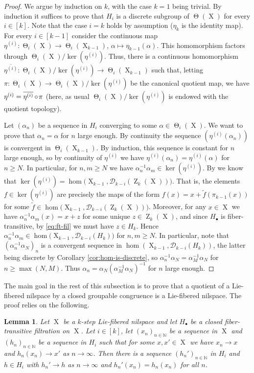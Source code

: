 \documentclass[a4paper,12pt,reqno]{amsart}
\newtheorem{lemma}[theorem]{Lemma}
\theoremstyle{definition}
\def\to{\rightarrow}
\newcommand{\mc}{\mathcal}
\newcommand{\mb}{\mathbb}
\DeclareMathOperator{\ab}{Z}
\DeclareMathOperator{\tran}{\Theta}
\DeclareMathOperator{\ns}{X}
\DeclareMathOperator{\co}{\circ\hspace{-0.02 cm}}
\begin{document}
\begin{proof}
We argue by induction on $k$, with the case $k=1$ being trivial. By induction it suffices to prove that $H_i$ is a discrete subgroup of $\tran(\ns)$ for every $i\in[k]$. Note that the case $i=k$ holds by assumption ($\eta_k$ is the identity map). For every $i\in [k-1]$ consider the continuous map $\eta^{(i)}:\tran_i(\ns)\to \tran_i(\ns_{k-1})$, $\alpha\mapsto \eta_{k-1}(\alpha)$. This homomorphism factors through $\tran_i(\ns)/\ker(\eta^{(i)})$. Thus, there is a continuous homomorphism $\overline{\eta^{(i)}}:\tran_i(\ns)/\ker(\eta^{(i)})\to \tran_i(\ns_{k-1})$ such that, letting $\pi:\tran_i(\ns)\to\tran_i(\ns)/\ker(\eta^{(i)})$ be the canonical quotient map, we have $\eta^{(i)} = \overline{\eta^{(i)}}\co \pi$ (here, as usual $\tran_i(\ns)/\ker(\eta^{(i)})$ is endowed with the quotient topology).

Let $(\alpha_n)$ be a sequence in $H_i$ converging to some $\alpha\in \tran_i(\ns)$. We want to prove that $\alpha_n=\alpha$ for $n$ large enough. By continuity the sequence $(\eta^{(i)}(\alpha_n))$ is convergent in $\tran_i(\ns_{k-1})$. By induction, this sequence is constant for $n$ large enough,  so by continuity of $\eta^{(i)}$ we have  $\eta^{(i)}(\alpha_n) = \eta^{(i)}(\alpha)$ for $n\ge N$. In particular, for $n,m\ge N$ we have  $\alpha_n^{-1}\alpha_m\in \ker(\eta^{(i)})$. By \cite[Lemma 2.9.5]{Cand:Notes2} we know that $\ker(\eta^{(i)})=\hom\big(\ns_{k-1},\mc{D}_{k-i}(\ab_k(\ns))\big)$. That is, the elements $f\in \ker(\eta^{(i)})$ are precisely the maps of the form $f(x)=x+\tilde{f}(\pi_{k-1}(x))$ for some $\tilde{f}\in \hom\big(\ns_{k-1},\mc{D}_{k-i}(\ab_k(\ns))\big)$. Moreover, for any $x\in \ns$ we have  $\alpha_n^{-1}\alpha_m(x)=x+z$ for some unique $z\in \ab_k(\ns)$, and since $H_\bullet$ is fiber-transitive, by \eqref{eq:ft-fil} we must have $z\in H_k$. Hence $\alpha_n^{-1}\alpha_m \in \hom\big(\ns_{k-1},\mc{D}_{k-i}(H_k)\big) $ for $n,m\ge N$. In particular, note that $(\alpha_n^{-1}\alpha_N)_n$ is a convergent sequence in $\hom(\ns_{k-1},\mc{D}_{k-i}(H_k))$, the latter being discrete by Corollary \ref{cor:hom-is-discrete}, so $\alpha_n^{-1}\alpha_N = \alpha_M^{-1}\alpha_N$ for $n\ge \max(N,M)$. Thus $\alpha_n=\alpha_N (\alpha_M^{-1}\alpha_N)^{-1} $ for $n$ large enough.
\end{proof}
\noindent The main goal in the rest of this subsection is to prove that a quotient of a Lie-fibered nilspace by a closed groupable congruence is a Lie-fibered nilspace. The proof relies on the following.
\begin{lemma}\label{lem:re-param-conv-seq}
Let $\ns$ be a $k$-step Lie-fibered nilspace and let $H_\bullet$ be a closed fiber-transitive filtration on $\ns$. Let $i\in [k]$, let $(x_n)_{n\in\mb{N}}$ be a sequence in $\ns$ and $(h_n)_{n\in\mb{N}}$ be a sequence in $H_i$ such that for some $x,x'\in\ns$ we have $x_n\to x$ and $h_n(x_n)\to x'$ as $n\to \infty$. Then there is a sequence $(h_n')_{n\in \mb{N}}$ in $H_i$ and $h\in H_i$ with $h_n'\to h$ as $n\to\infty$ and $h_n'(x_n)=h_n(x_n)$ for all $n$.
\end{lemma}
\end{document}

